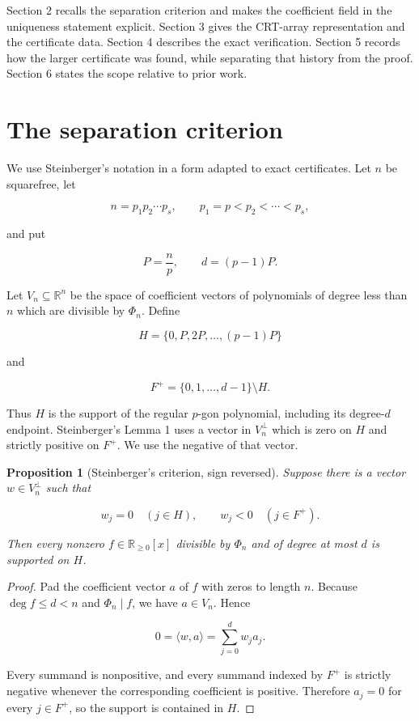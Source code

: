 \documentclass[11pt]{article}
\newtheorem{proposition}[theorem]{Proposition}
\numberwithin{equation}{section}
\begin{document}
Section 2 recalls the separation criterion and makes the coefficient field in
the uniqueness statement explicit. Section 3 gives the CRT-array
representation and the certificate data. Section 4 describes the exact
verification. Section 5 records how the larger certificate was found, while
separating that history from the proof. Section 6 states the scope relative to
prior work.

\section{The separation criterion}


We use Steinberger's notation in a form adapted to exact certificates. Let $n$
be squarefree, let

\nopagebreak[4]
\[
n=p_1p_2\cdots p_s,
\qquad p_1=p<p_2<\cdots<p_s,
\]

and put

\nopagebreak[4]
\[
P=\frac np,
\qquad d=(p-1)P.
\]

Let $V_n\subseteq\mathbb R^n$ be the space of coefficient vectors of
polynomials of degree less than $n$ which are divisible by $\Phi_n$. Define

\nopagebreak[4]
\[
H=\{0,P,2P,\ldots,(p-1)P\}
\tag{2.1}
\]

and

\nopagebreak[4]
\[
F^+=\{0,1,\ldots,d-1\}\setminus H.
\tag{2.2}
\]

Thus $H$ is the support of the regular $p$-gon polynomial, including its
degree-$d$ endpoint. Steinberger's Lemma 1 uses a vector in $V_n^\perp$ which
is zero on $H$ and strictly positive on $F^+$. We use the negative of that
vector.

\Needspace{0.28\textheight}
\begin{proposition}[Steinberger's criterion, sign reversed]

Suppose there is a vector $w\in V_n^\perp$ such that

\nopagebreak[4]
\[
w_j=0\quad(j\in H),
\qquad
w_j<0\quad(j\in F^+).
\tag{2.3}
\]

Then every nonzero $f\in\mathbb R_{\geq0}[x]$ divisible by $\Phi_n$ and of
degree at most $d$ is supported on $H$.

\end{proposition}

\begin{proof}

Pad the coefficient vector $a$ of $f$ with zeros to length $n$. Because
$\deg f\leq d<n$ and $\Phi_n\mid f$, we have $a\in V_n$. Hence

\nopagebreak[4]
\[
0=\langle w,a\rangle=\sum_{j=0}^{d}w_ja_j.
\]

Every summand is nonpositive, and every summand indexed by $F^+$ is strictly
negative whenever the corresponding coefficient is positive. Therefore
$a_j=0$ for every $j\in F^+$, so the support is contained in $H$.
\end{proof}
\end{document}
